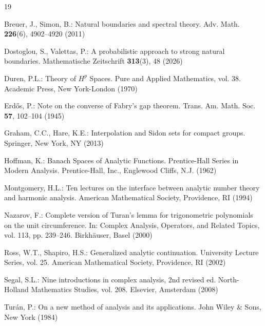 \documentclass[11pt,a4paper]{article}
\begin{document}
\begin{thebibliography}{19}

Breuer, J., Simon, B.: Natural boundaries and spectral theory. Adv. Math. \textbf{226}(6), 4902--4920 (2011)

Dostoglou, S., Valettas, P.: A probabilistic approach to strong natural boundaries. Mathematische Zeitschrift \textbf{313}(3), 48 (2026)

Duren, P.L.: Theory of $H^p$ Spaces. Pure and Applied Mathematics, vol. 38. Academic Press, New York-London (1970)

Erd{\H{o}}s, P.: Note on the converse of Fabry's gap theorem. Trans. Am. Math. Soc. \textbf{57}, 102--104 (1945)

Graham, C.C., Hare, K.E.: Interpolation and Sidon sets for compact groups. Springer, New York, NY (2013)

Hoffman, K.: Banach Spaces of Analytic Functions. Prentice-Hall Series in Modern Analysis. Prentice-Hall, Inc., Englewood Cliffs, N.J. (1962)

Montgomery, H.L.: Ten lectures on the interface between analytic number theory and harmonic analysis. American Mathematical Society, Providence, RI (1994)

Nazarov, F.: Complete version of Turan's lemma for trigonometric polynomials on the unit circumference. In: Complex Analysis, Operators, and Related Topics, vol. 113, pp. 239--246. Birkh\"{a}user, Basel (2000)

Ross, W.T., Shapiro, H.S.: Generalized analytic continuation. University Lecture Series, vol. 25. American Mathematical Society, Providence, RI (2002)

Segal, S.L.: Nine introductions in complex analysis, 2nd revised ed. North-Holland Mathematics Studies, vol. 208. Elsevier, Amsterdam (2008)



Tur{\'a}n, P.: On a new method of analysis and its applications. John Wiley \& Sons, New York (1984)

\end{thebibliography}
\end{document}
